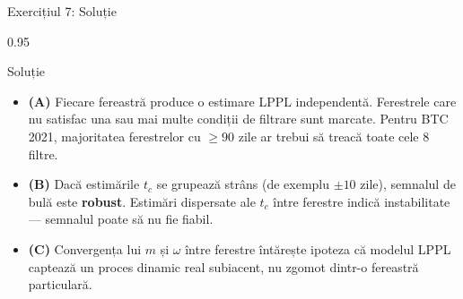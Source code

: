 \documentclass[9pt, aspectratio=169, t]{beamer}
\begin{document}
\begin{frame}{Exercițiul 7: Soluție}
    \begin{cminipage}{0.95\textwidth}
    \begin{exampleblock}{Soluție}
        {\small
        \begin{itemize}\setlength{\itemsep}{3pt}
            \item \textcolor{MainBlue}{\textbf{(A)}} Fiecare fereastră produce o estimare LPPL independentă. Ferestrele care nu satisfac una sau mai multe condiții de filtrare sunt marcate. Pentru BTC 2021, majoritatea ferestrelor cu $\geq 90$ zile ar trebui să treacă toate cele 8 filtre.
            \item \textcolor{MainBlue}{\textbf{(B)}} Dacă estimările $t_c$ se grupează strâns (de exemplu $\pm 10$ zile), semnalul de bulă este \textbf{robust}. Estimări dispersate ale $t_c$ între ferestre indică instabilitate --- semnalul poate să nu fie fiabil.
            \item \textcolor{MainBlue}{\textbf{(C)}} Convergența lui $m$ și $\omega$ între ferestre întărește ipoteza că modelul LPPL captează un proces dinamic real subiacent, nu zgomot dintr-o fereastră particulară.
        \end{itemize}
        }
    \end{exampleblock}
    \end{cminipage}
\end{frame}
\end{document}
